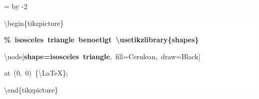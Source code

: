 \begingroup
\ttfamily
{}
=\textwidth
\advance{} by -2\fboxsep
\noindent
\colorbox{background}
{%
\parbox{\dimen255}
{%
\rule[-0.5ex]{0pt}{2.5ex}\hspace*{0.0em}\textbackslash{}begin\{tikzpicture\}\\
\rule[-0.5ex]{0pt}{2.5ex}\hspace*{1.0em}\textcolor{G}{\textbf{\%~isosceles~triangle~benoetigt~\textbackslash{}usetikzlibrary\{shapes\}}}\\
\rule[-0.5ex]{0pt}{2.5ex}\hspace*{1.0em}\textbackslash{}node[\textcolor{R}{\textbf{shape=isosceles~triangle}},~fill=Cerulean,~draw=Black]\\
\rule[-0.5ex]{0pt}{2.5ex}\hspace*{3.5em}at~(0,~0)~\{\textbackslash{}LaTeX\};\\
\rule[-0.5ex]{0pt}{2.5ex}\hspace*{0.0em}\textbackslash{}end\{tikzpicture\}}%
}%
\endgroup
